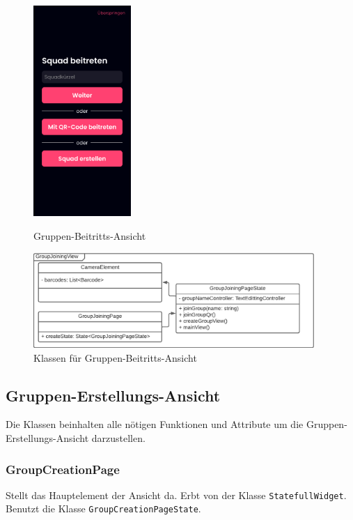 \documentclass[parskip=full]{scrartcl}
\begin{document}
    \begin{figure}[htp]
        \begin{minipage}
            [t]{0.49\textwidth}
            \centering
            \includegraphics[height=80mm]{images/Presentation-layer/GroupJoiningView.jpg}
            \caption{Gruppen-Beitritts-Ansicht}
        \end{minipage}
        \begin{minipage}
            [t]{0.49\textwidth}
            \centering
            \includegraphics[width=0.95\textwidth]{images/Presentation-layer/GroupJoiningViewClass.pdf}
            \caption{Klassen für Gruppen-Beitritts-Ansicht}
        \end{minipage}
    \end{figure}    
        
    \newpage        

\subsection{Gruppen-Erstellungs-Ansicht}
    Die Klassen beinhalten alle nötigen Funktionen und Attribute um die Gruppen-Erstellungs-Ansicht darzustellen.

    \subsubsection{GroupCreationPage}
    Stellt das Hauptelement der Ansicht da. Erbt von der Klasse \texttt{StatefullWidget}. Benutzt die Klasse \texttt{GroupCreationPageState}. 
\end{document}
